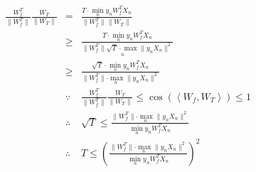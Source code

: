 \documentclass[12pt,letterpaper]{article}
\begin{document}
\begin{eqnarray}
    \frac{W_{f}^{T}}{\lVert W_{f}^{T} \rVert}\frac{W_T}{\lVert W_T \rVert}
    &=& \frac{T\cdot \underset{n}{\min}y_nW_f^TX_n}{\lVert W_{f}^{T} \rVert \lVert W_T \rVert}\\
    &\geqslant& \frac{T\cdot \underset{n}{\min}y_nW_f^TX_n}{\lVert W_{f}^{T} \rVert \underset{n}{\sqrt{T}\cdot \max}\lVert y_nX_n \rVert ^2}\nonumber\\
    &\geqslant& \frac{\sqrt{T}\cdot \underset{n}{\min}y_nW_f^TX_n}{\lVert W_{f}^{T} \rVert \underset{n}{\cdot \max}\lVert y_nX_n \rVert ^2}\nonumber\\
    &\because& \frac{W_{f}^{T}}{\lVert W_{f}^{T} \rVert}\frac{W_T}{\lVert W_T \rVert}\leqslant \cos \left( \left< W_f,W_T \right> \right) \leqslant 1\nonumber\\
    &\therefore& \sqrt{T}\leqslant \frac{\lVert W_{f}^{T} \rVert \underset{n}{\cdot \max}\lVert y_nX_n \rVert ^2}{\underset{n}{\min}y_nW_f^TX_n}\nonumber\\
    &\therefore& T\leqslant \left( \frac{\lVert W_{f}^{T} \rVert \underset{n}{\cdot \max}\lVert y_nX_n \rVert ^2}{\underset{n}{\min}y_nW_f^TX_n} \right) ^2\nonumber
\end{eqnarray}



%
%
%
%
%
%
%
%
\end{document}
